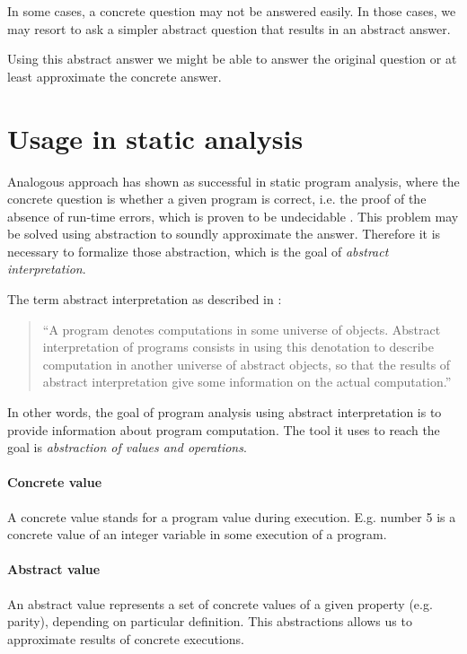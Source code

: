 \documentclass[12pt,oneside]{fithesis2}
\theoremstyle{definition}
\begin{document}
In some cases, a concrete question may not be answered easily. In those cases, we may resort to ask a simpler abstract question that results in an abstract answer.

Using this abstract answer we might be able to answer the original question or at least approximate the concrete answer. \cite{CousotCousot04-WCC}

\section{Usage in static analysis}

Analogous approach has shown as successful in static program analysis, where the concrete question is whether a given program is correct, i.e. the proof of the absence of run-time errors, which is proven to be undecidable \cite{mine-AIAA10}. This problem may be solved using abstraction to soundly approximate the answer. Therefore it is necessary to formalize those abstraction, which is the goal of \textit{abstract interpretation}.

The term abstract interpretation as described in \cite{CousotCousot77-1}:

\begin{quotation}
``A program denotes computations in some universe of objects. Abstract interpretation of programs consists in using this denotation to describe computation in another universe of abstract objects, so that the results of abstract interpretation give some information on the actual computation.''
\end{quotation}

In other words, the goal of program analysis using abstract interpretation is to provide information about program computation. The tool it uses to reach the goal is \textit{abstraction of values and operations}.

\paragraph{Concrete value}
A concrete value stands for a program value during execution. E.g. number 5 is a concrete value of an integer variable in some execution of a program.

\paragraph{Abstract value}
An abstract value represents a set of concrete values of a given property (e.g. parity), depending on particular definition. This abstractions allows us to approximate results of concrete executions.
\end{document}
